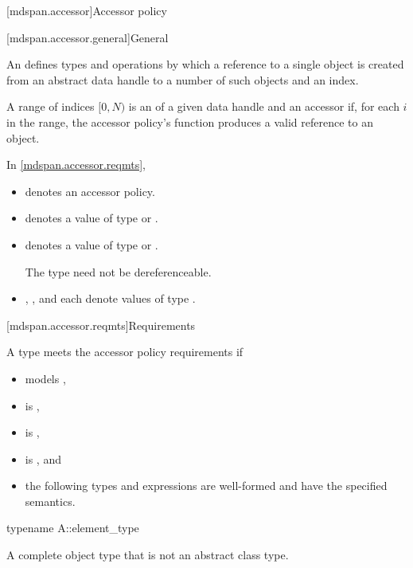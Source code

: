 [mdspan.accessor]{Accessor policy}

[mdspan.accessor.general]{General}

\pnum
An  defines types and operations by which
a reference to a single object is created
from an abstract data handle to a number of such objects and an index.

\pnum
A range of indices $[0, N)$ is an  of
a given data handle and an accessor
if, for each $i$ in the range,
the accessor policy's  function produces a valid reference to an object.

\pnum
In \ref{mdspan.accessor.reqmts},

\begin{itemize}
\item
{} denotes an accessor policy.
\item
{} denotes a value of type  or .
\item
{} denotes a value of type  or .
\begin{note}
The type  need not be dereferenceable.
\end{note}
\item
{}, , and  each denote values of type .
\end{itemize}

[mdspan.accessor.reqmts]{Requirements}

\pnum
A type  meets the accessor policy requirements if
\begin{itemize}
\item
{} models ,
\item
{} is ,
\item
{} is ,
\item
{} is , and
\item
the following types and expressions
are well-formed and have the specified semantics.
\end{itemize}

\begin{itemdecl}
typename A::element_type
\end{itemdecl}

\begin{itemdescr}
\pnum
\result
A complete object type that is not an abstract class type.
\end{itemdescr}

